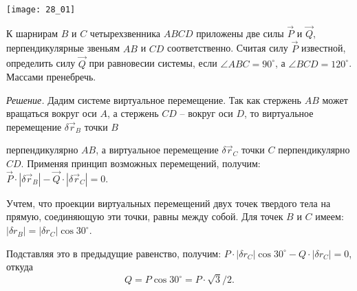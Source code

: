 \begin{minipage}{.4\textwidth}
    \texttt{[image: 28\_01]}
\end{minipage}
\begin{minipage}{.55\textwidth}
К шарнирам \( B \) и \( C \) четырехзвенника \( ABCD \) приложены две силы
\( \vec{P} \) и \( \vec{Q} \), перпендикулярные звеньям \( AB \) и \( CD \)
соответственно. Считая силу \( \vec{P} \) известной, определить силу
\( \vec{Q} \) при равновесии системы, если \( \angle ABC = 90^\circ \), а
\( \angle BCD = 120^\circ \). Массами пренебречь.

\emph{Решение.} Дадим системе виртуальное перемещение. Так как стержень \( AB \)
может вращаться вокруг оси \( A \), а стержень \( CD \) -- вокруг оси \( D \),
то виртуальное перемещение \( \delta\vec{r}_B \) точки \( B \)
\end{minipage}
перпендикулярно \( AB \), а виртуальное перемещение \( \delta\vec{r}_C \) точки
\( C \) перпендикулярно \( CD \). Применяя принцип возможных перемещений,
получим: \( \vec{P}\cdot|\delta\vec{r}_B| - \vec{Q}\cdot|\delta\vec{r}_C| = 0\).

Учтем, что проекции виртуальных перемещений двух точек твердого тела на прямую,
соединяющую эти точки, равны между собой. Для точек \( B \) и \( C \) имеем:
\( |\delta r_B| = |\delta r_C|\cos 30^\circ \).

Подставляя это в предыдущие равенство, получим:
\( P\cdot|\delta r_C|\cos 30^\circ - Q\cdot|\delta r_C| = 0 \), откуда
\[
    Q = P\cos 30^\circ = P\cdot\sqrt{3}/2.
\]

\newpage %
